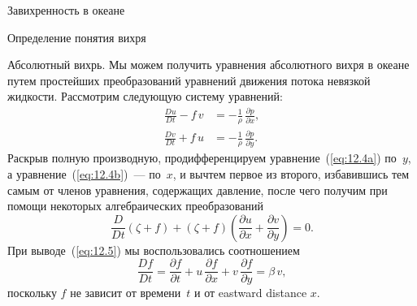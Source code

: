 \begin{chapter}{Завихренность в океане}
\begin{section}{Определение понятия вихря}
\begin{paragraph}{Абсолютный вихрь.}
Мы можем получить уравнения абсолютного вихря в океане путем
простейших преобразований уравнений движения потока невязкой
жидкости. Рассмотрим следующую систему уравнений:
\begin{subequations}
\begin{align}
 \frac{Du}{Dt} -f\,v &= -\frac{1}{\rho}\,\frac{\partial{p}}{\partial{x}},\label{eq:12.4a} \\
 \frac{Dv}{Dt} +f\,u &= -\frac{1}{\rho}\,\frac{\partial{p}}{\partial{y}}.\label{eq:12.4b}
\end{align}
\end{subequations}
Раскрыв полную производную, продифференцируем уравнение~(\ref{eq:12.4a}) 
по~$y$, а уравнение~(\ref{eq:12.4b})~--- по~$x$, и вычтем первое из второго,
избавившись тем самым от членов уравнения, содержащих давление, после
чего получим при помощи некоторых алгебраических преобразований
\begin{equation}\label{eq:12.5}
 \boxed{ \frac{D}{Dt}\left(\zeta + f\right) 
         + \left(\zeta + f\right)\left(\frac{\partial{u}}{\partial{x}} 
         + \frac{\partial{v}}{\partial{y}} \right) = 0. }
\end{equation}
При выводе~(\ref{eq:12.5}) мы воспользовались соотношением
\begin{displaymath}
\frac{Df}{Dt} = 
   \frac{\partial{f}}{\partial{t}}
   + u\,\frac{\partial{f}}{\partial{x}} 
   + v\,\frac{\partial{f}}{\partial{y}} = \beta \,v,
\end{displaymath}
поскольку $f$ не зависит от времени~$t$ и от eastward distance $x$.
%
\end{paragraph}


\end{section}
\end{chapter}
